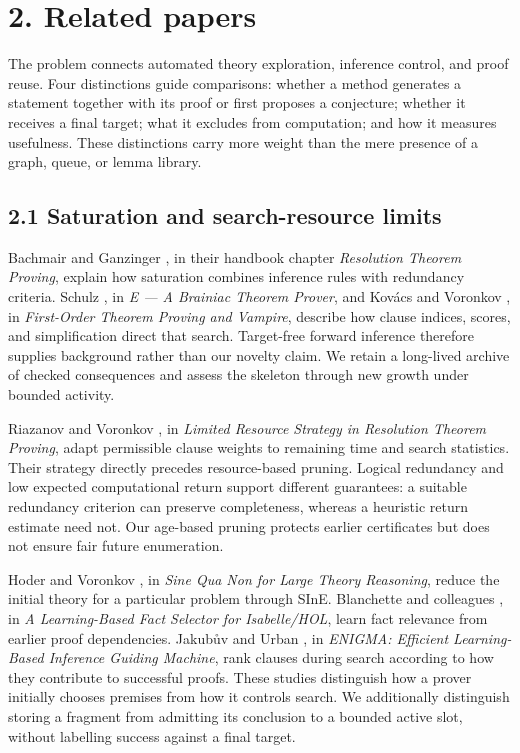 \documentclass[pdflatex,sn-basic,Numbered]{sn-jnl}
\begin{document}
\section*{2. Related papers}\label{related-papers}

The problem connects automated theory exploration, inference control, and proof reuse. Four distinctions guide comparisons: whether a method generates a statement together with its proof or first proposes a conjecture; whether it receives a final target; what it excludes from computation; and how it measures usefulness. These distinctions carry more weight than the mere presence of a graph, queue, or lemma library.

\subsection*{2.1 Saturation and search-resource limits}\label{saturation-and-search-resource-limits}

Bachmair and Ganzinger \citep{BachmairGanzinger2001}, in their handbook chapter \emph{Resolution Theorem Proving}, explain how saturation combines inference rules with redundancy criteria. Schulz \citep{Schulz2002}, in \emph{E --- A Brainiac Theorem Prover}, and Kov\'{a}cs and Voronkov \citep{KovacsVoronkov2013}, in \emph{First-Order Theorem Proving and Vampire}, describe how clause indices, scores, and simplification direct that search. Target-free forward inference therefore supplies background rather than our novelty claim. We retain a long-lived archive of checked consequences and assess the skeleton through new growth under bounded activity.

Riazanov and Voronkov \citep{RiazanovVoronkov2003LRS}, in \emph{Limited Resource Strategy in Resolution Theorem Proving}, adapt permissible clause weights to remaining time and search statistics. Their strategy directly precedes resource-based pruning. Logical redundancy and low expected computational return support different guarantees: a suitable redundancy criterion can preserve completeness, whereas a heuristic return estimate need not. Our age-based pruning protects earlier certificates but does not ensure fair future enumeration.

Hoder and Voronkov \citep{HoderVoronkov2011}, in \emph{Sine Qua Non for Large Theory Reasoning}, reduce the initial theory for a particular problem through SInE. Blanchette and colleagues \citep{BlanchetteEtAl2016}, in \emph{A Learning-Based Fact Selector for Isabelle/HOL}, learn fact relevance from earlier proof dependencies. Jakub\r{u}v and Urban \citep{JakubuvUrban2017}, in \emph{ENIGMA: Efficient Learning-Based Inference Guiding Machine}, rank clauses during search according to how they contribute to successful proofs. These studies distinguish how a prover initially chooses premises from how it controls search. We additionally distinguish storing a fragment from admitting its conclusion to a bounded active slot, without labelling success against a final target.
\end{document}
